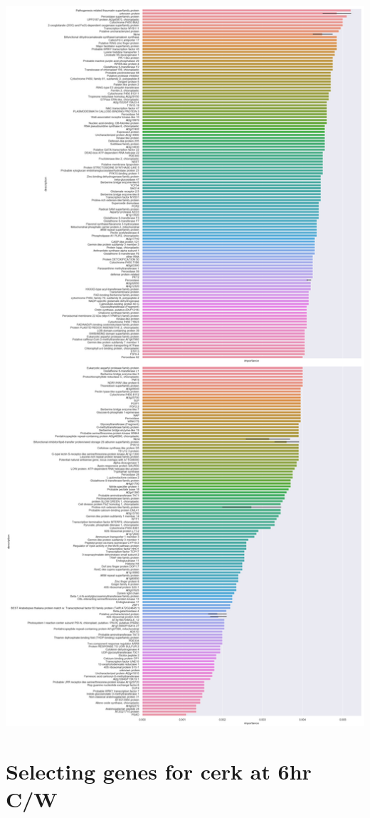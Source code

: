 \documentclass[11pt]{article}
\begin{document}
\begin{center}
\includegraphics[width=.9\linewidth]{obipy-resources/93e2fbf76ed477962282ae99767b8408de4d3ed9/1b47b6aac6dd71371ddfe0c230d6ff5c321ce636.png}
\end{center}

\section{Selecting genes for cerk at 6hr C/W}
\label{sec:orgfeaf414}
\end{document}
